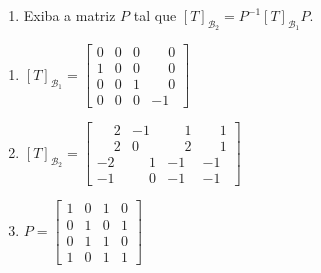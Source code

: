 \documentclass[12pt]{exam}
\begin{document}
\begin{exercicio}
\begin{enumerate}[label={\alph*})]
        \item Exiba a matriz $P$ tal que $[T]_{\mathcal{B}_2} = P^{-1}[T]_{\mathcal{B}_1}P$.
    \end{enumerate}
    \begin{solucao}
        \begin{enumerate}[label={\alph*})]
            \item $[T]_{\mathcal{B}_1} = \begin{bmatrix}
                0 & 0 & 0 & \phantom{-}0\\
                1 & 0 & 0 & \phantom{-}0\\
                0 & 0 & 1 & \phantom{-}0\\
                0 & 0 & 0 & -1
            \end{bmatrix}$

            \item $[T]_{\mathcal{B}_2} = \begin{bmatrix}
                \phantom{-}2 & -1 & \phantom{-}1 & \phantom{-}1\\
                \phantom{-}2 & 0 & \phantom{-}2 & \phantom{-}1\\
                -2 & \phantom{-}1 & -1 & -1\\
                -1 & \phantom{-}0 & -1 & -1
            \end{bmatrix}$

            \item $P = \begin{bmatrix}
                1 & 0 & 1 & 0\\
                0 & 1 & 0 & 1\\
                0 & 1 & 1 & 0\\
                1 & 0 & 1 & 1
            \end{bmatrix}$
        \end{enumerate}
    \end{solucao}
\end{exercicio}
\end{document}
